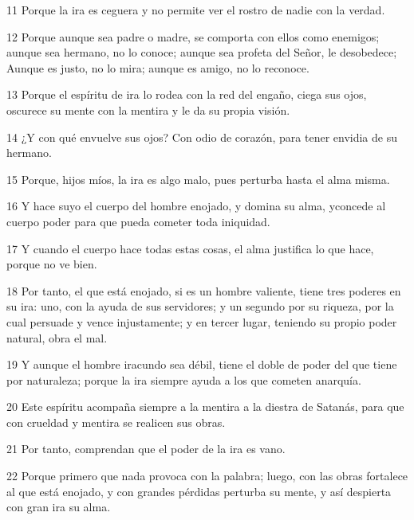 \par 11 Porque la ira es ceguera y no permite ver el rostro de nadie con la verdad.

\par 12 Porque aunque sea padre o madre, se comporta con ellos como enemigos; aunque sea hermano, no lo conoce; aunque sea profeta del Señor, le desobedece; Aunque es justo, no lo mira; aunque es amigo, no lo reconoce.

\par 13 Porque el espíritu de ira lo rodea con la red del engaño, ciega sus ojos, oscurece su mente con la mentira y le da su propia visión.

\par 14 ¿Y con qué envuelve sus ojos? Con odio de corazón, para tener envidia de su hermano.

\par 15 Porque, hijos míos, la ira es algo malo, pues perturba hasta el alma misma.

\par 16 Y hace suyo el cuerpo del hombre enojado, y domina su alma, y ​​concede al cuerpo poder para que pueda cometer toda iniquidad.

\par 17 Y cuando el cuerpo hace todas estas cosas, el alma justifica lo que hace, porque no ve bien.

\par 18 Por tanto, el que está enojado, si es un hombre valiente, tiene tres poderes en su ira: uno, con la ayuda de sus servidores; y un segundo por su riqueza, por la cual persuade y vence injustamente; y en tercer lugar, teniendo su propio poder natural, obra el mal.

\par 19 Y aunque el hombre iracundo sea débil, tiene el doble de poder del que tiene por naturaleza; porque la ira siempre ayuda a los que cometen anarquía.

\par 20 Este espíritu acompaña siempre a la mentira a la diestra de Satanás, para que con crueldad y mentira se realicen sus obras.

\par 21 Por tanto, comprendan que el poder de la ira es vano.

\par 22 Porque primero que nada provoca con la palabra; luego, con las obras fortalece al que está enojado, y con grandes pérdidas perturba su mente, y así despierta con gran ira su alma.

